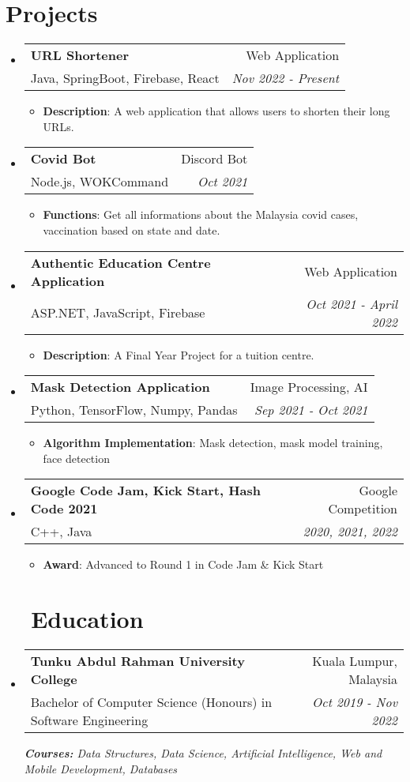 \documentclass[a4paper, 12pt]{article}
\makeatletter
\newcommand{\resumeItem}[2]{
  \item\small{
    \textbf{\textsf{#1}}{: \textsf{#2} \vspace{-2pt}}
  }
}
\newcommand{\resumeSubheading}[4]{
  \vspace{-1pt}\item
    \begin{tabular*}{0.97\textwidth}[t]{l@{\extracolsep{\fill}}r}
      \textbf{\textsf{#1}} & \textsf{#2} \\
      \textsf{\small{#3}} & \textit{\textsf{\small{#4}}} \\
    \end{tabular*}\vspace{-5pt}
}
\newcommand{\resumeSubHeadingListStart}{\begin{itemize}[leftmargin=*]}
\newcommand{\resumeSubHeadingListEnd}{\end{itemize}}
\newcommand{\resumeItemListStart}{\begin{itemize}}
\newcommand{\resumeItemListEnd}{\end{itemize}\vspace{-5pt}}
\makeatother
\begin{document}
\section{Projects}
        
    \resumeSubHeadingListStart
    \resumeSubheading
    {URL Shortener}{Web Application}
    {Java, SpringBoot, Firebase, React}{Nov 2022 - Present}
        \resumeItemListStart
            \resumeItem{Description}
            {A web application that allows users to shorten their long URLs.}
        \resumeItemListEnd
        \resumeSubheading
        {Covid Bot}{Discord Bot}
        {Node.js, WOKCommand}{Oct 2021}
            \resumeItemListStart
                \resumeItem{Functions}
                {Get all informations about the Malaysia covid cases, vaccination based on state and date.}
            \resumeItemListEnd
    
    \vspace{5px}
    \resumeSubheading
        {Authentic Education Centre Application}{Web Application}
        {ASP.NET, JavaScript, Firebase}{Oct 2021 - April 2022}
            \resumeItemListStart
                \resumeItem{Description}
                {A Final Year Project for a tuition centre.}
            \resumeItemListEnd

    \vspace{5px}
    \resumeSubheading
        {Mask Detection Application}{Image Processing, AI}
        {Python, TensorFlow, Numpy, Pandas}{Sep 2021 - Oct 2021}
            \resumeItemListStart
                \resumeItem{Algorithm Implementation}
                {Mask detection, mask model training, face detection}
            \resumeItemListEnd
            
    \vspace{5px}
       
    \vspace{5px}
    \resumeSubheading
        {Google Code Jam, Kick Start, Hash Code 2021}{Google Competition}
        {C++, Java}{2020, 2021, 2022}
            \resumeItemListStart
                \resumeItem{Award}
                {Advanced to Round 1 in Code Jam \& Kick Start}
            \resumeItemListEnd
            
    \vspace{5px}
\resumeSubHeadingListEnd


\section{~~Education}
  \resumeSubHeadingListStart
    \resumeSubheading
      {Tunku Abdul Rahman University College}{Kuala Lumpur, Malaysia}
      {Bachelor of Computer Science (Honours) in Software Engineering}{Oct 2019 - Nov 2022}
      {\scriptsize \textit{ \footnotesize{\newline{}\textbf{Courses:} Data Structures, Data Science, Artificial Intelligence, Web and Mobile Development, Databases}}}
    \resumeSubHeadingListEnd
\end{document}
